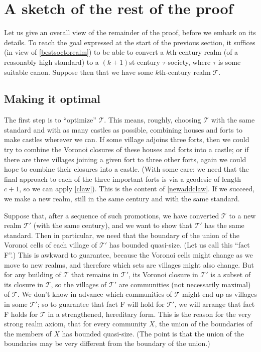 \documentclass[titlepage,11pt]{article}
\newcommand{\mac}{\mathcal}
\begin{document}
	
	\section{A sketch of the rest of the proof}\label{sec:sketch}
	
	Let us give an overall view of the remainder of the proof, before we embark on its details. To reach the goal expressed at the start of the previous section, it suffices (in view of \ref{bestsoctorealm}) to be able  
	to convert a $k$th-century realm (of a reasonably high standard) to a $(k+1)$st-century $\tau$-society, where $\tau$
	is some suitable canon. 
	Suppose then that we have some $k$th-century realm $\mac T$.
	
	\subsection{Making it optimal}
	
	The first step is to ``optimize'' $\mac T$.
	This means, roughly, choosing $\mac T$ with the same standard and with as many castles as possible, combining houses and forts to make castles wherever we can.
	If some village adjoins three forts, 
	then we could try
	to combine the Voronoi closures of these houses and forts into a castle; or if there are three villages joining a given fort to three other forts,
	again we could hope to combine their closures into a castle. 
	(With some care: we need that the final approach to  each of the three important forts is via a geodesic of length $c+1$, so we can apply \ref{claw}). This is the content of \ref{newaddclaw}.
	If we succeed, we make a new realm, still in the same century and with the same standard.
	
	Suppose that, after a sequence of such promotions, we have converted $\mac T$ to a new realm $\mac T'$ (with the same century), and we want to show that 
	$\mac T'$ has the same standard.  
	Then in particular, we need that
	the boundary of the union of the Voronoi cells of each village 
	of $\mac T'$ has bounded  
	quasi-size. (Let us call this ``fact F''.) This is awkward to guarantee, because the Voronoi cells might change as we move to new realms, and therefore which sets are villages 
	might also change. But for any building of $\mac T$
	that remains in $\mac T'$, its Voronoi closure in $\mac T'$ is a subset of its closure in $\mac T$, so the villages of $\mac T'$ are 
	communities (not necessarily maximal) of $\mac T$. We don't know in advance which communities of $\mac T$ might end up as 
	villages in some $\mac T'$; so to guarantee that fact F will hold for $\mac T'$, 
	we will arrange that fact F holds for $\mac T$ in a strengthened, hereditary form. This is the reason for the very strong realm axiom, 
	that for every community $X$, the                                  
	union of the 
	boundaries of the members of $X$ has bounded quasi-size. (The point is that the union of the boundaries may be very different from 
	the boundary of the union.)
	
\end{document}
